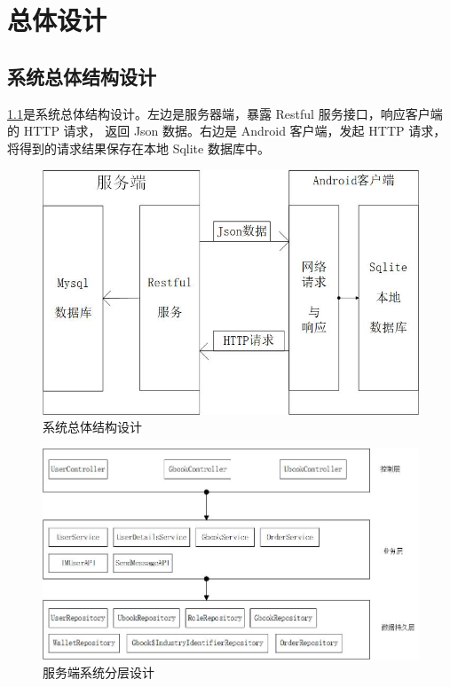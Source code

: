 
\chapter{总体设计}

\section{系统总体结构设计}
\cref{all_module_design}是系统总体结构设计。左边是服务器端，暴露 Restful 服务接口，响应客户端的 HTTP 请求，
返回 Json 数据。右边是 Android 客户端，发起 HTTP 请求，将得到的请求结果保存在本地 Sqlite 数据库中。

\begin{figure}[h]
	\centering
	\includegraphics[scale=0.5]{Chapters/UML/system_structrue.jpg}
	\caption{系统总体结构设计}
	\label{all_module_design}
\end{figure}

\begin{figure}[h]
	\centering
	\includegraphics[scale=0.6]{Chapters/UML/system_level_design.jpg}
	\caption{服务端系统分层设计}
	\label{system_level_design}
\end{figure}

